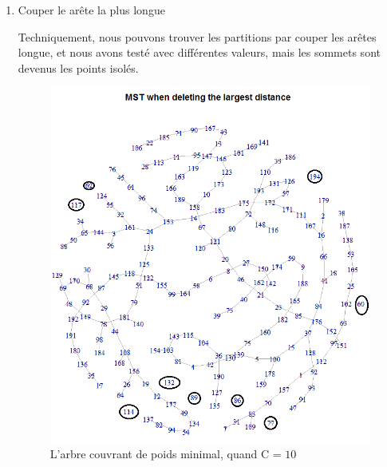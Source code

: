 \begin{enumerate}
  \item Couper le arête la plus longue
  
  Techniquement, nous pouvons trouver les partitions par couper les arêtes longue, et nous avons testé avec différentes valeurs, mais les sommets sont devenus les points isolés.
  
  \begin{figure}[H]
\centering
\includegraphics[width=0.6\linewidth]{images/mst10}
\caption{L'arbre couvrant de poids minimal, quand C = $10$}
\label{fig:mst10}
\end{figure}

  \end{enumerate}










